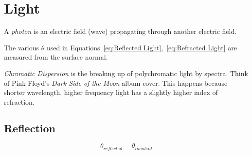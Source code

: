 \section{Light}\label{sec:Light}
\begin{definition}[Photon]
  A \emph{photon} is an electric field (wave) propagating through another electric field.
\end{definition}
The various $\theta$ used in Equations~\eqref{eq:Reflected Light},~\eqref{eq:Refracted Light} are measured from the surface normal.

\emph{Chromatic Dispersion} is the breaking up of polychromatic light by spectra.
Think of Pink Floyd's \textit{Dark Side of the Moon} album cover.
This happens because shorter wavelength, higher frequency light has a slightly higher index of refraction.

\subsection{Reflection}\label{subsec:Reflection}
\begin{equation}\label{eq:Reflected Light}
  \theta_{reflected} = \theta_{incident}
\end{equation}


